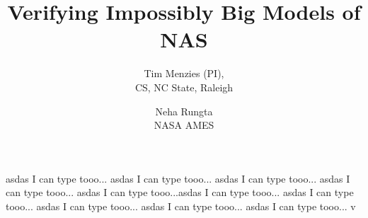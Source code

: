 \documentclass[12pt]{article}
\begin{document}
\title{Verifying Impossibly Big Models of NAS} 
\author{Tim Menzies (PI),\\
CS, NC State, Raleigh
\and
Neha Rungta\\
NASA AMES}
\date{}
\maketitle

asdas
I can type tooo...
asdas
I can type tooo...
asdas
I can type tooo...
asdas
I can type tooo...
asdas
I can type tooo...asdas
I can type tooo...
asdas
I can type tooo...
asdas
I can type tooo...
asdas
I can type tooo...
asdas
I can type tooo...
v 
\newpage


\end{document}
